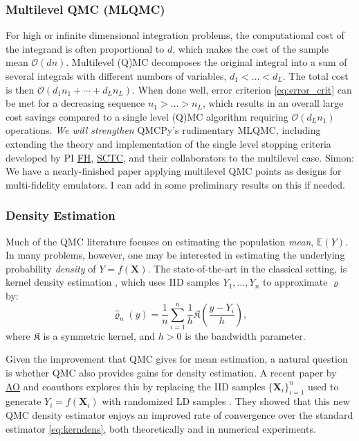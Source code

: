 \documentclass[11pt]{NSFamsart}
\newcommand{\FH}{\hyperlink{FHlink}{FH}\xspace}
\newcommand{\SCTC}{\hyperlink{SCTClink}{SCTC}\xspace}
\newcommand{\AO}{\hyperlink{AOlink}{AO}\xspace}
\newcommand{\bX}{{\boldsymbol{X}}}
\newcommand{\fK}{{\mathfrak{K}}}
\newcommand{\Order}{\mathcal{O}}
\newcommand{\SMNote}[1]{{\color{blue}Simon: #1}}
\begin{document}
\subsubsection{Multilevel QMC (MLQMC)}
For high or infinite dimensional integration problems, the computational cost of the integrand is often proportional to $d$, which makes the cost of the sample mean $\Order(dn)$.  Multilevel (Q)MC \cite{Gil15a} decomposes the original integral into a sum of several integrals with different numbers of variables, $d_1 < \dots < d_L$.  The total cost is then $\Order(d_1 n_1 + \cdots + d_L n_L)$. When done well, error criterion \eqref{eq:error_crit} can be met for a decreasing sequence $n_1 > \dots > n_L$, which results in an overall large cost savings compared to a single level (Q)MC algorithm requiring $\Order(d_Ln_1)$ operations. \emph{We will strengthen} QMCPy's rudimentary MLQMC, including extending the theory and implementation of the single level stopping criteria developed by PI \FH, \SCTC, and their collaborators \cite{HicEtal14a,HicJim16a,JimHic16a,HicEtal17a,RatHic19a} to the multilevel case. \SMNote{We have a nearly-finished paper applying multilevel QMC points as designs for multi-fidelity emulators. I can add in some preliminary results on this if needed.}

\subsubsection{Density Estimation}

Much of the QMC literature focuses on estimating the population \textit{mean}, $\mathbb{E}(Y)$. In many problems, however, one may be interested in estimating the underlying probability \textit{density} of $Y = f(\bX)$. The state-of-the-art in the classical setting, is kernel density estimation \cite{silverman1986density}, which uses IID samples $Y_1, \dots, Y_n$ to approximate $\varrho$ by:
\begin{equation}\label{eq:kerndens}
\hat{\varrho}_n(y) = \frac{1}{n} \sum_{i=1}^n \frac{1}{h} \fK \left( \frac{y - Y_i}{h} \right),
\end{equation}
where $\fK$ is a symmetric kernel, and $h>0$ is the bandwidth parameter.

Given the improvement that QMC gives for mean estimation, a natural question is whether QMC also provides gains for density estimation. A recent paper \cite{abdellah2018density} by \AO and coauthors explores this by replacing the IID samples $\{\bX_i\}_{i=1}^n$ used to generate $Y_i = f(\bX_i)$ with randomized LD samples \cite{owen2000monte}. They showed that this new QMC density estimator enjoys an improved rate of convergence over the standard estimator \eqref{eq:kerndens}, both theoretically and in numerical experiments.
\end{document}
